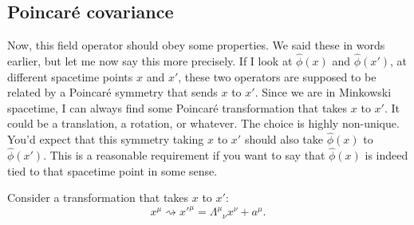 \subsection{Poincar\'e covariance}
\label{sec:253a-poincare}

Now, this field operator should obey some properties. We said these in words
earlier, but let me now say this more precisely.
If I look at $\hat\phi(x)$ and $\hat\phi(x')$, at different spacetime points $x$
and $x'$, these two operators are supposed to be related by a Poincaré symmetry
that sends $x$ to $x'$.
Since we are in Minkowski spacetime, I can always find some Poincaré
transformation that takes $x$ to $x'$. It could be a translation, a rotation, or
whatever. The choice is highly non-unique.
You'd expect that this symmetry taking $x$ to $x'$ should also take
$\hat\phi(x)$ to $\hat\phi(x')$. This is a reasonable requirement if you want to
say that $\hat\phi(x)$ is indeed tied to that spacetime point in some sense.

Consider a transformation that takes $x$ to $x'$:
\begin{equation}
  x^\mu\rightsquigarrow x'^\mu
  =\Lambda^\mu{}_{\nu}x^\nu+a^\mu.
  \label{eq:253a-poincare-coordinate-map}
\end{equation}

